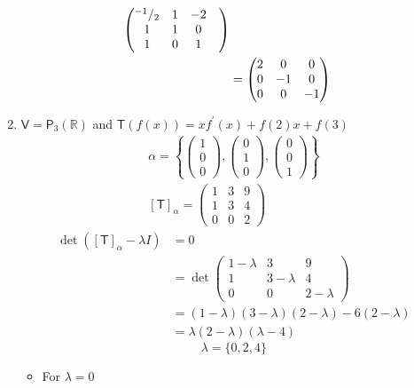 \begin{enumerate}
\begin{align}
\begin{pmatrix}
^{-1}/_{2} & 1 & -2&\\
1 & 1 & 0&\\
1 & 0 & 1&
\end{pmatrix}\\
&= \begin{pmatrix}
2 & 0 & 0\\
0 & -1 & 0\\
0 & 0 & -1
\end{pmatrix}
\end{align}
\setcounter{enumii}{4}
\item $\mathsf{V}=\mathsf{P}_3(\mathbb{R})$ and
  $\mathsf{T}(f(x))=xf^\prime(x)+f(2)x+f(3)$
\begin{gather}
\alpha =
\left\{\begin{pmatrix}1\\0\\0\end{pmatrix},\begin{pmatrix}0\\1\\0\end{pmatrix},\begin{pmatrix}0\\0\\1\end{pmatrix}\right\}\\
[\mathsf{T}]_\alpha = \begin{pmatrix}
1 & 3 & 9\\
1 & 3 & 4\\
0 & 0 & 2
\end{pmatrix}
\end{gather}
\begin{align}
\det{([\mathsf{T}]_\alpha-\lambda I)} &= 0\\
&= \det{\begin{pmatrix}
1 -\lambda & 3 & 9\\
1 & 3-\lambda & 4\\
0 & 0 & 2-\lambda
\end{pmatrix}}\\
&= (1-\lambda)(3-\lambda)(2-\lambda)-6(2-\lambda)\\
&=\lambda(2-\lambda)(\lambda-4)
\end{align}
\begin{equation}
\lambda =\{0,2,4\}
\end{equation}
\begin{itemize}
\item For $\lambda =0$
\begin{gather}

\end{gather}
\end{itemize}
\end{enumerate}

